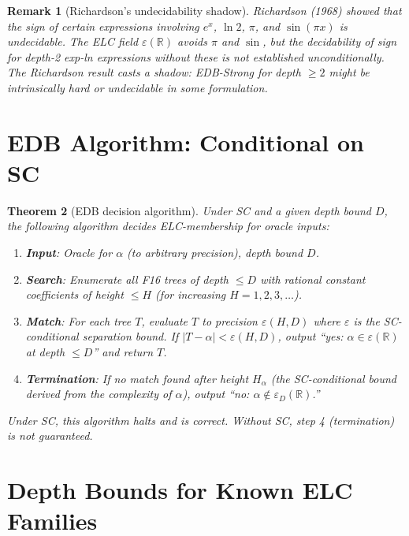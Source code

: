 \documentclass[11pt]{article}
\newtheorem{theorem}{Theorem}
\newtheorem{remark}[theorem]{Remark}
\begin{document}
\begin{remark}[Richardson's undecidability shadow]
Richardson (1968) showed that the sign of certain expressions involving $e^x$,
$\ln 2$, $\pi$, and $\sin(\pi x)$ is undecidable.
The ELC field $\varepsilon(\mathbb{R})$ avoids $\pi$ and $\sin$, but the decidability
of sign for depth-2 exp-ln expressions without these is not established unconditionally.
The Richardson result casts a shadow: EDB-Strong for depth $\geq 2$ might be
intrinsically hard or undecidable in some formulation.
\end{remark}

\section{EDB Algorithm: Conditional on SC}

\begin{theorem}[EDB decision algorithm]
\label{thm:edb_algorithm}
Under SC and a given depth bound $D$, the following algorithm decides ELC-membership
for oracle inputs:
\begin{enumerate}
  \item \textbf{Input}: Oracle for $\alpha$ (to arbitrary precision), depth bound $D$.
  \item \textbf{Search}: Enumerate all F16 trees of depth $\leq D$ with rational
    constant coefficients of height $\leq H$ (for increasing $H = 1, 2, 3, \ldots$).
  \item \textbf{Match}: For each tree $T$, evaluate $T$ to precision $\varepsilon(H, D)$
    where $\varepsilon$ is the SC-conditional separation bound. If $|T - \alpha| < \varepsilon(H,D)$,
    output ``yes: $\alpha \in \varepsilon(\mathbb{R})$ at depth $\leq D$'' and return $T$.
  \item \textbf{Termination}: If no match found after height $H_\alpha$ (the SC-conditional
    bound derived from the complexity of $\alpha$), output ``no: $\alpha \notin \varepsilon_D(\mathbb{R})$.''
\end{enumerate}
Under SC, this algorithm halts and is correct.
Without SC, step 4 (termination) is not guaranteed.
\end{theorem}

\section{Depth Bounds for Known ELC Families}
\end{document}
